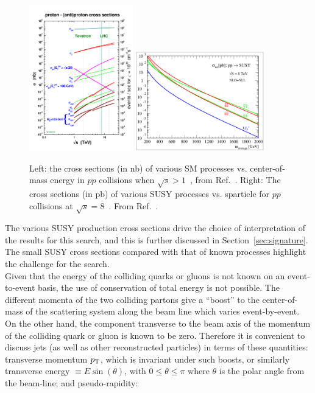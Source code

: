 \begin{figure}[h!]
  \begin{center}
      \includegraphics[width=0.40\textwidth,trim=0 2cm 0 0]{figures/crosssections2012_v5}
      \includegraphics[width=0.5\textwidth, trim = .6cm .1cm .54cm .1cm, clip=true]{figures/nlonll_lhc8_tpformat.eps}
      \caption{\label{fig:crossSec} Left: the cross sections (in nb) of various SM processes vs. center-of-mass
              energy in $pp$ collisions when $\sqrt{s}>1$~\TeV, from Ref.~\cite{stirling-xs}. Right: 
              The cross sections (in pb) of various SUSY processes vs. sparticle for $pp$ collisions
              at $\sqrt{s}=8$~\TeV. From Ref.~\cite{Beenakker:1996ed}.} 
  \end{center}
\end{figure}

The various SUSY production cross sections drive the choice of interpretation 
of the results for this search, and this is further discussed in Section~\ref{sec:signature}. 
The small SUSY cross sections compared with that of known processes highlight 
the challenge for the search.\\
\indent Given that the energy of the colliding quarks or gluons is not known on 
an event-to-event basis, the use of conservation of total energy is not possible. 
The different momenta of the two colliding partons give a ``boost'' to the center-of-mass 
of the scattering system along the beam line which varies event-by-event. On the other hand, 
the component transverse to the beam axis of the momentum of the colliding quark or gluon is 
known to be zero. Therefore it is convenient to discuss jets (as well as other reconstructed 
particles) in terms of these quantities: transverse momentum $p_{\mathrm{T}}$, which is invariant under 
such boosts, or similarly transverse energy $\equiv E \sin\left(\theta\right)$, with 
$0 \leq \theta \leq \pi$ where $\theta$ is the polar angle from the beam-line; and pseudo-rapidity:

